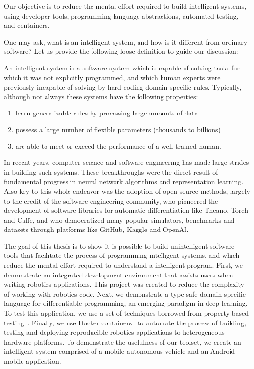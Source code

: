 \documentclass[12pt,initial,twoside,maitrise]{dms}
\numberwithin{equation}{section}
\numberwithin{table}{chapter}
\numberwithin{figure}{chapter}
\begin{document}
Our objective is to reduce the mental effort required to build intelligent systems, using developer tools, programming language abstractions, automated testing, and containers.

One may ask, what is an intelligent system, and how is it different from ordinary software? Let us provide the following loose definition to guide our discussion:

An intelligent system is a software system which is capable of solving tasks for which it was not explicitly programmed, and which human experts were previously incapable of solving by hard-coding domain-specific rules. Typically, although not always these systems have the following properties:

\begin{enumerate}
    \item learn generalizable rules by processing large amounts of data
    \item possess a large number of flexible parameters (thousands to billions)
    \item are able to meet or exceed the performance of a well-trained human.
\end{enumerate}

In recent years, computer science and software engineering has made large strides in building such systems. These breakthroughs were the direct result of fundamental progress in neural network algorithms and representation learning. Also key to this whole endeavor was the adoption of open source methods, largely to the credit of the software engineering community, who pioneered the development of software libraries for automatic differentiation like Theano, Torch and Caffe, and who democratized many popular simulators, benchmarks and datasets through platforms like GitHub, Kaggle and OpenAI.

The goal of this thesis is to show it is possible to build unintelligent software tools that facilitate the process of programming intelligent systems, and which reduce the mental effort required to understand a intelligent program. First, we demonstrate an integrated development environment that assists users when writing robotics applications. This project was created to reduce the complexity of working with robotics code. Next, we demonstrate a type-safe domain specific language for differentiable programming, an emerging paradigm in deep learning. To test this application, we use a set of techniques borrowed from property-based testing~\cite{fink1997property}. Finally, we use Docker containers~\cite{merkel2014docker} to automate the process of building, testing and deploying reproducible robotics applications to heterogeneous hardware platforms. To demonstrate the usefulness of our toolset, we create an intelligent system comprised of a mobile autonomous vehicle and an Android mobile application.
\end{document}
